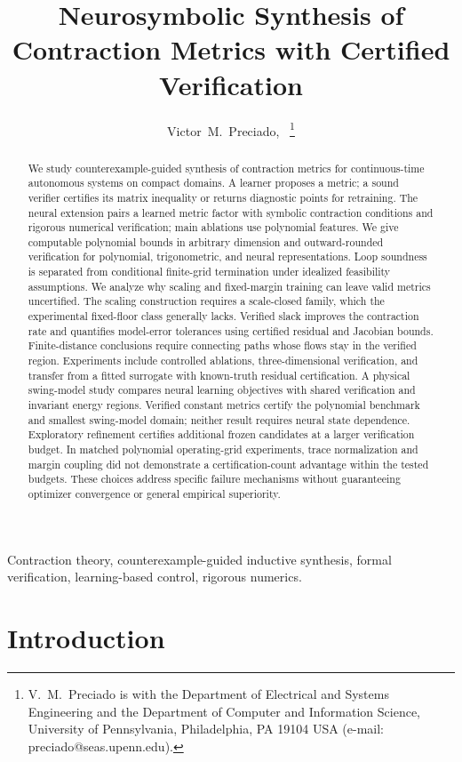 \documentclass[12pt,onecolumn,journal]{IEEEtran}
\title{Neurosymbolic Synthesis of Contraction Metrics with Certified Verification}
\author{Victor~M.~Preciado,~\IEEEmembership{Senior~Member,~IEEE}%
\thanks{V.~M.~Preciado is with the Department of Electrical and Systems
Engineering and the Department of Computer and Information Science,
University of Pennsylvania, Philadelphia, PA 19104 USA
(e-mail: preciado@seas.upenn.edu).}}
\begin{document}
\maketitle

\begin{abstract}
We study counterexample-guided synthesis of contraction metrics for continuous-time autonomous systems on compact domains. A learner proposes a metric; a sound verifier certifies its matrix inequality or returns diagnostic points for retraining. The neural extension pairs a learned metric factor with symbolic contraction conditions and rigorous numerical verification; main ablations use polynomial features. We give computable polynomial bounds in arbitrary dimension and outward-rounded verification for polynomial, trigonometric, and neural representations. Loop soundness is separated from conditional finite-grid termination under idealized feasibility assumptions. We analyze why scaling and fixed-margin training can leave valid metrics uncertified. The scaling construction requires a scale-closed family, which the experimental fixed-floor class generally lacks. Verified slack improves the contraction rate and quantifies model-error tolerances using certified residual and Jacobian bounds. Finite-distance conclusions require connecting paths whose flows stay in the verified region. Experiments include controlled ablations, three-dimensional verification, and transfer from a fitted surrogate with known-truth residual certification. A physical swing-model study compares neural learning objectives with shared verification and invariant energy regions. Verified constant metrics certify the polynomial benchmark and smallest swing-model domain; neither result requires neural state dependence. Exploratory refinement certifies additional frozen candidates at a larger verification budget. In matched polynomial operating-grid experiments, trace normalization and margin coupling did not demonstrate a certification-count advantage within the tested budgets. These choices address specific failure mechanisms without guaranteeing optimizer convergence or general empirical superiority.
\end{abstract}

\begin{IEEEkeywords}
Contraction theory, counterexample-guided inductive synthesis, formal verification,
learning-based control, rigorous numerics.
\end{IEEEkeywords}

\section{Introduction}
\end{document}
